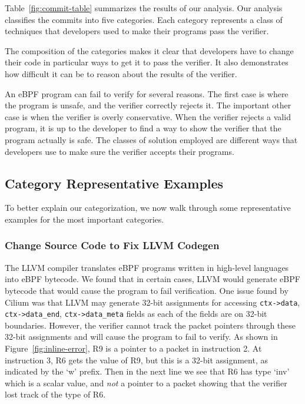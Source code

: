 Table~\ref{fig:commit-table} summarizes the results of our analysis.
Our analysis classifies the commits into five categories.
Each category represents a class of techniques that developers used to make their programs pass the verifier.


The composition of the categories makes it clear that developers have to change their code in particular ways to get it to pass the verifier.
It also demonstrates how difficult it can be to reason about the results of the verifier.

An eBPF program can fail to verify for several reasons.
The first case is where the program is unsafe, and the verifier correctly rejects it.
The important other case is when the verifier is overly conservative.
When the verifier rejects a valid program, it is up to the developer to find a way to show the verifier that the program actually is safe.
The classes of solution employed are different ways that developers use to make sure the verifier accepts their programs.

\subsection{Category Representative Examples}
To better explain our categorization, we now walk through some representative examples for the most important categories.

\subsubsection{Change Source Code to Fix LLVM Codegen}
\label{motivation:llvm-codegen}
The LLVM compiler translates eBPF programs written in high-level languages into eBPF bytecode.
We found that in certain cases, LLVM would generate eBPF bytecode that would cause the program to fail verification.
One issue found by Cilium was that LLVM may generate 32-bit assignments for
    accessing \texttt{ctx->data}, \texttt{ctx->data\_end}, \texttt{ctx->data\_meta} fields as
    each of the fields are on 32-bit boundaries.
However, the verifier cannot track the packet pointers through these 32-bit assignments and
    will cause the program to fail to verify.
As shown in Figure~\ref{fig:inline-error}, R9 is a pointer to a packet in instruction 2.
At instruction 3, R6 gets the value of R9, but this is a 32-bit assignment, as indicated by the `w' prefix.
Then in the next line we see that R6 has type `inv' which is a scalar value, and \emph{not} a pointer to a packet showing that the verifier lost track of the type of R6.

